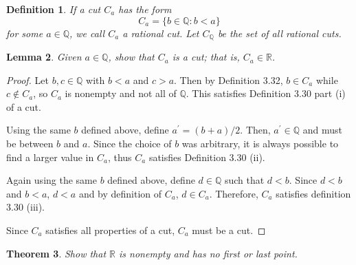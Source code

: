\documentclass{amsart}
\newtheorem{theorem}{Theorem}
\newtheorem{lemma}[theorem]{Lemma}
\newtheorem{definition}[theorem]{Definition}
\newcommand{\Q}{\mathbb Q}
\newcommand{\R}{\mathbb R}
\newcommand{\1}{\mathds{1}}
\def \R {{\mathbb {R}}}
\numberwithin{equation}{section}
\numberwithin{theorem}{section}
\begin{document}
\begin{definition}
	If a cut $C_a$ has the form
	\[
	C_a = \{b \in \Q: b < a\}
	\]
	for some $a\in \Q$, we call $C_a$ a {\em rational cut}.  Let $C_\Q$ be the set of all rational cuts.
\end{definition}



\begin{lemma}
	Given $a\in \Q$, show that $C_a$ is a cut; that is, $C_a \in \R$.
\end{lemma}

\begin{proof}
	Let $b,c\in\Q$ with $b<a$ and $c>a$. Then by Definition 3.32, $b\in C_a$ while $c\notin C_a$, so $C_a$ is nonempty and not all of $\Q$. This satisfies Definition 3.30 part (i) of a cut.
	
	Using the same $b$ defined above, define $a^\prime = (b+a)/2$. Then, $a^\prime\in\Q$ and must be between $b$ and $a$. Since the choice of $b$ was arbitrary, it is always possible to find a larger value in $C_a$, thus $C_a$ satisfies Definition 3.30 (ii).
	
	Again using the same $b$ defined above, define $d\in\Q$ such that $d<b$. Since $d<b$ and $b<a$, $d<a$ and by definition of $C_a$, $d\in C_a$. Therefore, $C_a$ satisfies definition 3.30 (iii).
	
	Since $C_a$ satisfies all properties of a cut, $C_a$ must be a cut. 
\end{proof}


\begin{theorem}
	Show that $\R$ is nonempty and has no first or last point.
\end{theorem}
\end{document}
